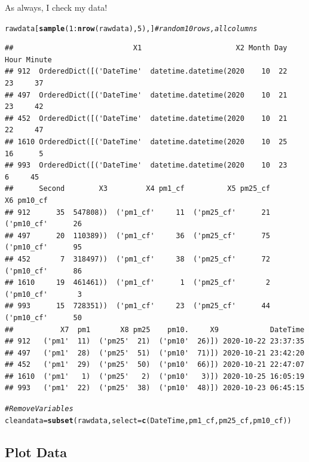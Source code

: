 \documentclass{article}\usepackage[]{graphicx}\usepackage[]{color}
\makeatletter
\newcommand{\hlnum}[1]{\textcolor[rgb]{0.686,0.059,0.569}{#1}}%
\newcommand{\hlcom}[1]{\textcolor[rgb]{0.678,0.584,0.686}{\textit{#1}}}%
\newcommand{\hlopt}[1]{\textcolor[rgb]{0,0,0}{#1}}%
\newcommand{\hlstd}[1]{\textcolor[rgb]{0.345,0.345,0.345}{#1}}%
\newcommand{\hlkwb}[1]{\textcolor[rgb]{0.69,0.353,0.396}{#1}}%
\newcommand{\hlkwc}[1]{\textcolor[rgb]{0.333,0.667,0.333}{#1}}%
\newcommand{\hlkwd}[1]{\textcolor[rgb]{0.737,0.353,0.396}{\textbf{#1}}}%
\newenvironment{kframe}{%
 \def\at@end@of@kframe{}%
 \ifinner\ifhmode%
  \def\at@end@of@kframe{\end{minipage}}%
  \begin{minipage}{\columnwidth}%
 \fi\fi%
 \def\FrameCommand##1{\hskip\@totalleftmargin \hskip-\fboxsep
 \colorbox{shadecolor}{##1}\hskip-\fboxsep
     \hskip-\linewidth \hskip-\@totalleftmargin \hskip\columnwidth}%
 \MakeFramed {\advance\hsize-\width
   \@totalleftmargin\z@ \linewidth\hsize
   \@setminipage}}%
 {\par\unskip\endMakeFramed%
 \at@end@of@kframe}
\newenvironment{knitrout}{}{} %
\makeatother
\begin{document}
As always, I check my data!

\begin{knitrout}
\color{fgcolor}\begin{kframe}
\begin{alltt}
\hlstd{rawdata[}\hlkwd{sample}\hlstd{(}\hlnum{1}\hlopt{:}\hlkwd{nrow}\hlstd{(rawdata),} \hlnum{5}\hlstd{),]} \hlcom{# random 10 rows, all columns}
\end{alltt}
\begin{verbatim}
##                            X1                      X2 Month Day Hour Minute
## 912  OrderedDict([('DateTime'  datetime.datetime(2020    10  22   23     37
## 497  OrderedDict([('DateTime'  datetime.datetime(2020    10  21   23     42
## 452  OrderedDict([('DateTime'  datetime.datetime(2020    10  21   22     47
## 1610 OrderedDict([('DateTime'  datetime.datetime(2020    10  25   16      5
## 993  OrderedDict([('DateTime'  datetime.datetime(2020    10  23    6     45
##      Second        X3         X4 pm1_cf          X5 pm25_cf          X6 pm10_cf
## 912      35  547808))  ('pm1_cf'     11  ('pm25_cf'      21  ('pm10_cf'      26
## 497      20  110389))  ('pm1_cf'     36  ('pm25_cf'      75  ('pm10_cf'      95
## 452       7  318497))  ('pm1_cf'     38  ('pm25_cf'      72  ('pm10_cf'      86
## 1610     19  461461))  ('pm1_cf'      1  ('pm25_cf'       2  ('pm10_cf'       3
## 993      15  728351))  ('pm1_cf'     23  ('pm25_cf'      44  ('pm10_cf'      50
##           X7  pm1       X8 pm25    pm10.     X9            DateTime
## 912   ('pm1'  11)  ('pm25'  21)  ('pm10'  26)]) 2020-10-22 23:37:35
## 497   ('pm1'  28)  ('pm25'  51)  ('pm10'  71)]) 2020-10-21 23:42:20
## 452   ('pm1'  29)  ('pm25'  50)  ('pm10'  66)]) 2020-10-21 22:47:07
## 1610  ('pm1'   1)  ('pm25'   2)  ('pm10'   3)]) 2020-10-25 16:05:19
## 993   ('pm1'  22)  ('pm25'  38)  ('pm10'  48)]) 2020-10-23 06:45:15
\end{verbatim}
\begin{alltt}
\hlcom{# Remove Variables}
\hlstd{cleandata} \hlkwb{=} \hlkwd{subset}\hlstd{(rawdata,} \hlkwc{select}\hlstd{=}\hlkwd{c}\hlstd{(DateTime, pm1_cf, pm25_cf, pm10_cf))}
\end{alltt}
\end{kframe}
\end{knitrout}

\subsection{Plot Data}
\end{document}
